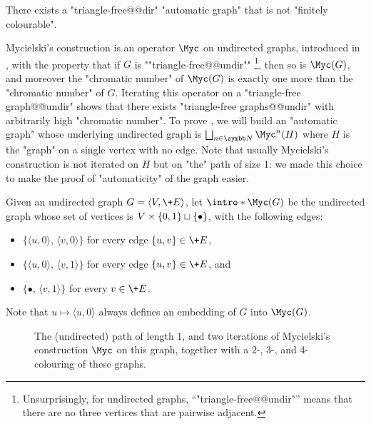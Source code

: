 \begin{proposition}
	\AP\label{prop:automatic-graph-not-fin-colourable}
	There exists a "triangle-free@@dir" "automatic graph" that is not "finitely colourable".
\end{proposition}

Mycielski's construction is an operator $\Myc$ on undirected graphs,
introduced in \cite{Mycielski55Coloriage}, with the property that if $G$ is \AP""triangle-free@@undir""%
\footnote{Unsurprisingly, for undirected graphs, ``"triangle-free@@undir"'' means that there are no
three vertices that are pairwise adjacent.},
then so is $\Myc(G)$, and moreover
the "chromatic number" of $\Myc(G)$ is exactly one more than the "chromatic number" of $G$.
Iterating this operator on a "triangle-free graph@@undir" shows that there exists
"triangle-free graphs@@undir" with arbitrarily high "chromatic number".
To prove , we will build
an "automatic graph" whose underlying undirected graph is
$\bigdcup_{n\in\N} \Myc^n(H)$ where $H$ is the "graph" on a single vertex with no edge.
Note that usually Mycielski's construction is not iterated on $H$ but on "the"
path of size 1: we made this choice to make the proof of "automaticity" of the graph
easier.

\begin{definition}
  Given an undirected graph $G = \langle V, \+E \rangle$, let
  \AP$\intro*\Myc(G)$ be the undirected graph whose set of vertices is
  $V\times\{0,1\} \dcup \{\bullet\}$, with the following edges:
  \begin{itemize}
    \item $\{\langle u, 0 \rangle,\, \langle v, 0 \rangle\}$
      for every edge $\{ u,v \} \in \+E$,
    \item $\{\langle u, 0 \rangle,\, \langle v, 1 \rangle\}$
      for every edge $\{ u,v \} \in \+E$, and
    \item $\{ \bullet,\, \langle v, 1 \rangle\}$
      for every $v \in \+E$.
  \end{itemize}
\end{definition}

Note that $u \mapsto \langle u,0\rangle$ always defines an embedding of
$G$ into $\Myc(G)$.

\begin{figure}
	\centering
	\begin{tikzpicture}
		
	\end{tikzpicture}
	\caption{
		\AP\label{fig:Mycielski}
		The (undirected) path of length 1,
		and two iterations of Mycielski's construction $\Myc$ on this graph,
		together with a $2$-, $3$-, and $4$-colouring of these graphs. 
	}
\end{figure}

